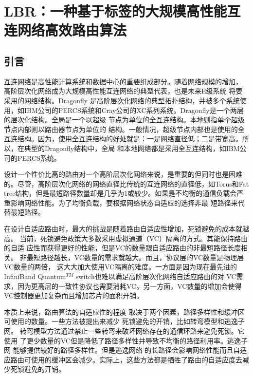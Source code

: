 \chapter{LBR：一种基于标签的大规模高性能互连网络高效路由算法}

\section{引言}

互连网络是高性能计算系统和数据中心的重要组成部分。随着网络规模的增加，
高阶层次化网络成为大规模高性能互连网络的典型代表，也是未来E级系统
将要采用的网络结构。Dragonfly 是高阶层次化网络的典型拓扑结构，并被多个系统使用，如IBM公司的PERCS系统和Cray公司的XC系列系统。Dragonfly是一个两层的层次化结构。全局是一个以超级
节点为单位的全互连结构。本地则指单个超级节点内部则以路由器节点为单位的
结构。一般情况，超级节点内部也是使用的全互连结构。因为，使用全互连结构的好处就是：一是网络直径低；二是带宽高。所以，在典型的Dragonfly结构中，全局
和本地网络都是采用全互连结构，如IBM公司的PERCS系统。

设计一个性价比高的路由对一个高阶层次化网络来说，是重要的但同时也是困难
的。尽管，高阶层次化网络的网络直径比传统的互连网络的直径低，如Torus和Fat tree结构，但是最短路径数量却是几乎为1或较少。如果是不均衡的通信负载会严重影响网络性能。为了均衡负载，要根据网络状态自适应的选择非最
短路径来代替最短路径。

在设计自适应路由时，最大的挑战是随着路由自适应性增加，死锁避免的成本就越高。
当前，死锁避免政策大多数采用虚拟通道（VC）隔离的方式。其能保持路由的自适
应性而获得更好的性能，但是VC的数量跟自适应路由的非最短路径长度相关。
非最短路径越长，VC数量的需求就越大。而且，协议层的VC数量是物理层VC数量的两倍，
这大大加大使用VC隔离的难度。一方面是因为现在最先进的InfiniBand Quantum$^{TM}$ switch也难以满足高阶层次化网络自适应路由的对
VC需求，因为更高层的一致性协议也需要消耗VC。另一方面，VC数量的增加会使得
VC控制器更加复杂而且增加芯片的面积开销。

本质上来说，路由算法的自适应性的程度
取决于两个因素，路径多样性和缓冲区可使用的数量。一些方法被提出来减少
死锁避免的开销，比如转弯模型和逃逸子网。
转弯模型方法通过禁止一些转弯来破坏网络存在的通信环路来避免死锁。它使用
了更少数量的VC但是降低了路径多样性并导致不均衡的路径利用率。逃逸子网
能够提供较好的路径多样性。但是逃逸网络
的长路径会影响网络性能而且自适应路由可使用的缓冲区会减少。实际上，这些方法都是牺牲了路由的自适应度去减少死锁避免的开销。

